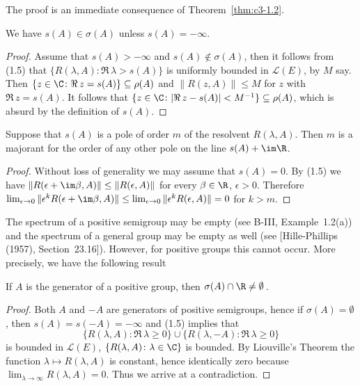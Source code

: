 The proof is an immediate consequence of Theorem~\ref{thm:c3-1.2}.

\begin{corollary}\label{cor:c3-1.4}
We have $s(A) \in \sigma(A)$ unless $s(A) = -\infty$.
\end{corollary}

\begin{proof}
Assume that $s(A) > -\infty$ and $s(A) \notin \sigma(A)$, then it follows from (1.5) that $\{R(\lambda,A) \colon \Re\,\lambda > s(A)\}$ is uniformly bounded in $\mathcal{L}(E)$,
%
by $M$ say. Then $\{z \in \C  \colon \Re\, z = s(A)\} \subseteq \rho(A)$ and $\|R(z,A)\| \leq M$ for $z$ with $\Re\, z = s(A)$. It follows that $\{z \in \C  \colon |\Re\, z - s(A)| < M^{-1}\} \subseteq \rho(A)$, which is absurd by the definition of $s(A)$.
\end{proof}

\begin{corollary}\label{cor:c3-1.5}
Suppose that $s(A)$ is a pole of order $m$ of the resolvent $R(\lambda,A)$.
Then $m$ is a majorant for the order of any other pole on the line $s(A) + \im\R $.
\end{corollary}

\begin{proof}
Without loss of generality we may assume that $s(A) = 0$.
By (1.5) we have $\|R(\epsilon+\im\beta ,A)\| \leq \|R(\epsilon,A)\|$ for every $\beta \in \R $, $\epsilon > 0$.
Therefore $\lim_{\epsilon\to 0}\|\epsilon^k R(\epsilon+\im\beta ,A)\| \leq \lim_{\epsilon\to 0}\|\epsilon^k R(\epsilon,A)\| = 0$ for $k > m$.
\end{proof}

The spectrum of a positive semigroup may be empty (see B-III, Example~1.2(a)) and the spectrum of a general group may be empty as well (see [Hille-Phillips (1957), Section~23.16]).
However, for positive groups this cannot occur.
More precisely, we have the following result
\begin{corollary}\label{cor:c3-1.6}
If $A$ is the generator of a positive group, then $\sigma(A)\cap\R  \neq \emptyset$\,.
\end{corollary}

\begin{proof}
Both $A$ and $-A$ are generators of positive semigroups, hence if $\sigma(A) = \emptyset$, then $s(A) = s(-A) = -\infty$ and (1.5) implies that 
\[
\{R(\lambda,A) \colon \Re\, \lambda \geq 0\} \cup \{R(\lambda,-A) \colon \Re\, \lambda \geq 0\}
\]
is bounded in $\mathcal{L}(E)$, \ie  $\{R(\lambda,A) \colon \lambda \in \C \}$ is bounded.
By Liouville's Theorem the function $\lambda \mapsto R(\lambda,A)$ is constant, hence identically zero because $\lim_{\lambda\to\infty}R(\lambda,A) = 0$.
Thus we arrive at a contradiction.
\end{proof}

